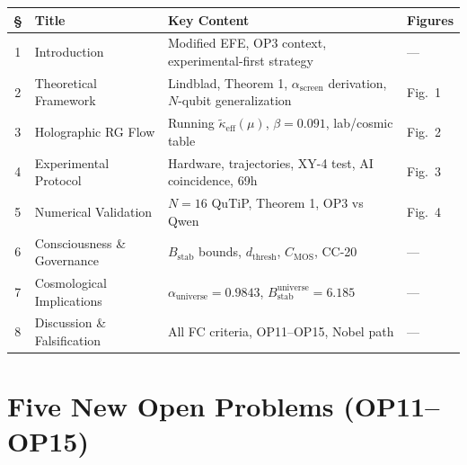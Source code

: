 \documentclass[11pt,letterpaper]{article}
\newcommand{\asc}{\alpha_{\mathrm{screen}}}
\newcommand{\keff}{\tilde{\kappa}_{\mathrm{eff}}}
\newcommand{\Bstab}{B_{\mathrm{stab}}}
\newcommand{\CMOS}{C_{\mathrm{MOS}}}
\begin{document}
\begin{table}[h!]
\centering\small
\begin{tabular}{clp{4.5cm}l}
\toprule
\textbf{\S} & \textbf{Title} & \textbf{Key Content} & \textbf{Figures} \\
\midrule
1 & Introduction & Modified EFE, OP3 context, experimental-first strategy & --- \\
2 & Theoretical Framework & Lindblad, Theorem 1, $\asc$ derivation, $N$-qubit generalization & Fig.\ 1 \\
3 & Holographic RG Flow & Running $\keff(\mu)$, $\beta = 0.091$, lab/cosmic table & Fig.\ 2 \\
4 & Experimental Protocol & Hardware, trajectories, XY-4 test, AI coincidence, 69h & Fig.\ 3 \\
5 & Numerical Validation & $N=16$ QuTiP, Theorem 1, OP3 vs Qwen & Fig.\ 4 \\
6 & Consciousness \& Governance & $\Bstab$ bounds, $d_{\mathrm{thresh}}$, $\CMOS$, CC-20 & --- \\
7 & Cosmological Implications & $\alpha_{\mathrm{universe}} = 0.9843$, $\Bstab^{\mathrm{universe}} = 6.185$ & --- \\
8 & Discussion \& Falsification & All FC criteria, OP11--OP15, Nobel path & --- \\
\bottomrule
\end{tabular}
\end{table}

\newpage
\section{Five New Open Problems (OP11--OP15)}
\end{document}
